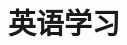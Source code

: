 \documentclass[a4paper，12pt]{article}
\begin{document}
%
%
%
%
%
%
%
%
%
%
%
%

\section{英语学习}
\end{document}
